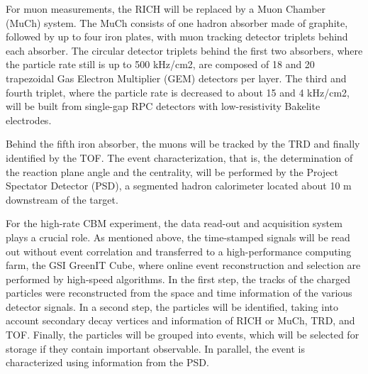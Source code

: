 For muon measurements, the RICH will be replaced by a Muon Chamber (MuCh) system. The MuCh consists of one hadron absorber made of graphite, followed by up to four iron plates, with muon tracking detector triplets behind each absorber. The circular detector triplets behind the first two absorbers, where the particle rate still is up to 500 kHz/cm2, are composed of 18 and 20 trapezoidal Gas Electron
Multiplier (GEM) detectors per layer. The third and fourth triplet, where the particle rate is decreased to about 15 and 4 kHz/cm2, will be built from single-gap RPC detectors with low-resistivity Bakelite electrodes.

Behind the fifth iron absorber, the muons will be tracked by the TRD and finally identified by the TOF. The event characterization, that is, the determination of the reaction plane angle and the centrality, will be performed by the Project Spectator Detector (PSD), a segmented hadron calorimeter located about 10 m downstream of the target.

For the high-rate CBM experiment, the data read-out and acquisition system plays a crucial role. As mentioned above, the time-stamped signals will be read out without event correlation and transferred to a high-performance computing farm, the GSI GreenIT Cube, where online event reconstruction and selection are performed by high-speed algorithms. In the first step, the tracks of the charged particles were reconstructed from the space and time information of the various detector signals. In a second step, the particles will be identified, taking into account secondary decay vertices and information of RICH or MuCh, TRD, and TOF. Finally, the particles will be grouped into events, which will be selected for storage if they contain important observable. In parallel, the event is characterized using information from the PSD.



